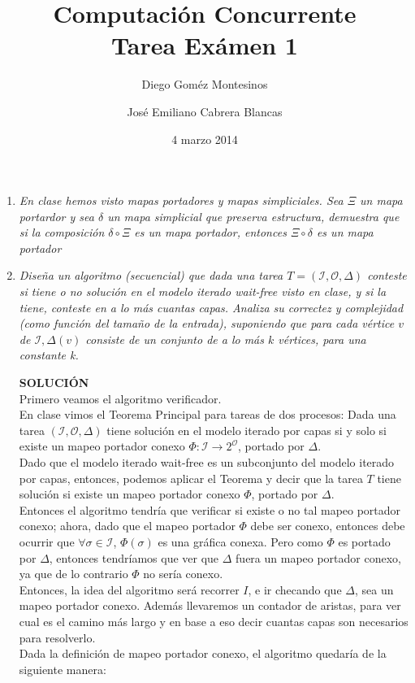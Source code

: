 \documentclass{article}
\title{Computación Concurrente \\ \Large{Tarea Exámen 1}}
\author{
  Diego Goméz Montesinos
  \and
  José Emiliano Cabrera Blancas
  }
\date{4 marzo 2014}
\begin{document}
\maketitle
\begin{enumerate}
  
\item{
    \textsl{
      En clase hemos visto mapas portadores y mapas simpliciales. Sea $\Xi$ un
      mapa portardor y sea $\delta$ un mapa simplicial que preserva estructura,
      demuestra que si la composición $\delta \circ \Xi$ es un mapa portador, 
      entonces $\Xi \circ \delta$ es un mapa portador
    }
  }
  
\item{
    \textsl{ 
      Diseña un algoritmo (secuencial) que dada una tarea $T = (\mathcal{I},\mathcal{O},\Delta)$
      conteste si tiene o no solución en el modelo iterado wait-free visto en clase, y si la tiene,
      conteste en a lo más cuantas capas. Analiza su correctez y complejidad (como función del tamaño
      de la entrada), suponiendo que para cada vértice $v$ de $\mathcal{I},\Delta(v)$ consiste de 
      un conjunto de a lo más $k$ vértices, para una constante k.
    }

    \textbf{SOLUCIÓN}\\
    Primero veamos el algoritmo verificador.\\
    En clase vimos el Teorema Principal para tareas de dos procesos: Dada una tarea $(\mathcal{I},\mathcal{O},\Delta)$
    tiene solución en el modelo iterado por capas si y solo si existe un mapeo portador conexo
    $\Phi: \mathcal{I} \rightarrow 2^{\mathcal{O}}$, portado por $\Delta$.\\
    Dado que el modelo iterado wait-free es un subconjunto del modelo iterado por capas, entonces, podemos
    aplicar el Teorema y decir que la tarea $T$ tiene solución si existe un mapeo portador conexo $\Phi$, portado por $\Delta$.\\
    Entonces el algoritmo tendría que verificar si existe o no tal mapeo portador conexo; ahora, dado que el mapeo portador
    $\Phi$ debe ser conexo, entonces debe ocurrir que $\forall\sigma\in\mathcal{I}$, $\Phi(\sigma)$ es una
    gráfica conexa. Pero como $\Phi$ es portado por $\Delta$, entonces tendríamos que ver que $\Delta$ fuera un mapeo portador
    conexo, ya que de lo contrario $\Phi$ no sería conexo.\\
    Entonces, la idea del algoritmo será recorrer $I$, e ir checando que $\Delta$, sea un mapeo portador conexo.
    Además llevaremos un contador de aristas, para ver cual es el camino más largo y en base a eso decir cuantas capas
    son necesarios para resolverlo.\\
    Dada la definición de mapeo portador conexo, el algoritmo quedaría de la siguiente manera:\\
    
}
\end{enumerate}
\end{document}
